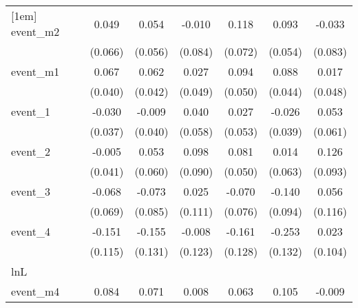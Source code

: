 {\begin{tabular}{l*{6}{c}}
[1em]
event\_m2    &       0.049         &       0.054         &      -0.010         &       0.118         &       0.093         &      -0.033         \\
            &     (0.066)         &     (0.056)         &     (0.084)         &     (0.072)         &     (0.054)         &     (0.083)         \\
[1em]
event\_m1    &       0.067         &       0.062         &       0.027         &       0.094         &       0.088\sym{*}  &       0.017         \\
            &     (0.040)         &     (0.042)         &     (0.049)         &     (0.050)         &     (0.044)         &     (0.048)         \\
[1em]
event\_1     &      -0.030         &      -0.009         &       0.040         &       0.027         &      -0.026         &       0.053         \\
            &     (0.037)         &     (0.040)         &     (0.058)         &     (0.053)         &     (0.039)         &     (0.061)         \\
[1em]
event\_2     &      -0.005         &       0.053         &       0.098         &       0.081         &       0.014         &       0.126         \\
            &     (0.041)         &     (0.060)         &     (0.090)         &     (0.050)         &     (0.063)         &     (0.093)         \\
[1em]
event\_3     &      -0.068         &      -0.073         &       0.025         &      -0.070         &      -0.140         &       0.056         \\
            &     (0.069)         &     (0.085)         &     (0.111)         &     (0.076)         &     (0.094)         &     (0.116)         \\
[1em]
event\_4     &      -0.151         &      -0.155         &      -0.008         &      -0.161         &      -0.253         &       0.023         \\
            &     (0.115)         &     (0.131)         &     (0.123)         &     (0.128)         &     (0.132)         &     (0.104)         \\
\hline
lnL         &                     &                     &                     &                     &                     &                     \\
event\_m4    &       0.084         &       0.071         &       0.008         &       0.063         &       0.105         &      -0.009         \\

\end{tabular}}
